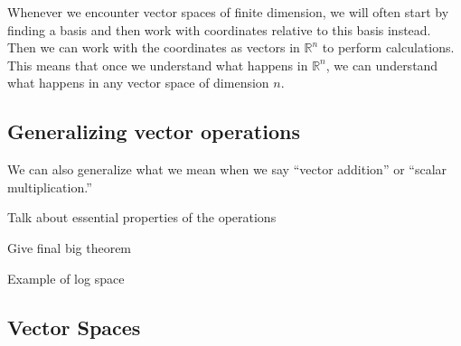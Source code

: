 Whenever we encounter vector spaces of finite dimension, we will often start by finding a basis and then work with coordinates relative to this basis instead. Then we can work with the coordinates as vectors in ${\mathbb{R}}^n$ to perform calculations. This means that once we understand what happens in ${\mathbb{R}}^n$, we can understand what happens in any vector space of dimension $n$. 

\subsection{Generalizing vector operations}

We can also generalize what we mean when we say ``vector addition'' or ``scalar multiplication.''  

Talk about essential properties of the operations

Give final big theorem

Example of log space





\subsection{Vector Spaces}

